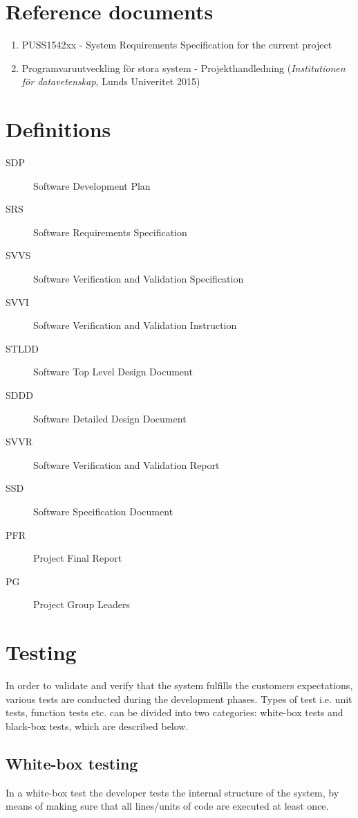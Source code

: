 \documentclass[a4paper]{article}
\begin{document}
\section{Reference documents}
\begin{enumerate}
\item PUSS1542xx - System Requirements Specification for the current project \label{refdocs:srs}
\item Programvaruutveckling för stora system - Projekthandledning (\textit{Institutionen för datavetenskap}, Lunds Univeritet 2015) \label{refdocs:projekthandledning}
\end{enumerate}

\section{Definitions}
\begin{description}
\item[SDP] Software Development Plan
\item[SRS] Software Requirements Specification
\item[SVVS] Software Verification and Validation Specification
\item[SVVI] Software Verification and Validation Instruction
\item[STLDD] Software Top Level Design Document
\item[SDDD] Software Detailed Design Document
\item[SVVR] Software Verification and Validation Report
\item[SSD] Software Specification Document
\item[PFR] Project Final Report
\item[PG] Project Group Leaders
\end{description}
\section{Testing}
In order to validate and verify that the system fulfills the customers expectations, various tests are conducted during the development phases. Types of test i.e. unit tests, function tests etc. can be divided into two categories: white-box tests and black-box tests, which are described below.   

\subsection{White-box testing}
In a white-box test the developer tests the internal structure of the system, by means of making sure that all lines/units of code are executed at least once.
\end{document}
